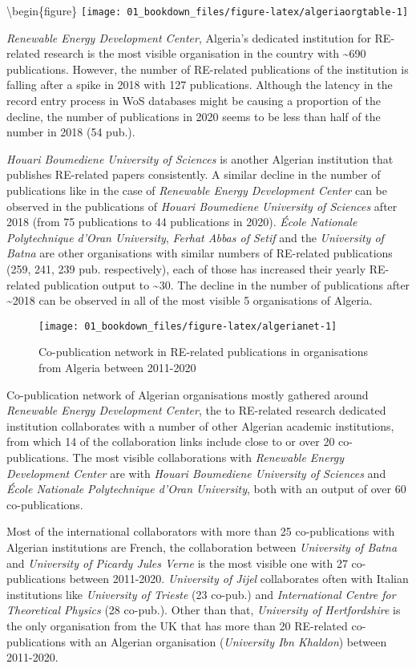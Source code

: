 \documentclass[12pt,twoside]{report}
\begin{document}
\textbackslash begin\{figure\}
\texttt{[image: 01\_bookdown\_files/figure-latex/algeriaorgtable-1]}

\emph{Renewable Energy Development Center}, Algeria's dedicated institution for RE-related research is the most visible organisation in the country with \textasciitilde690 publications. However, the number of RE-related publications of the institution is falling after a spike in 2018 with 127 publications. Although the latency in the record entry process in WoS databases might be causing a proportion of the decline, the number of publications in 2020 seems to be less than half of the number in 2018 (54 pub.).

\emph{Houari Boumediene University of Sciences} is another Algerian institution that publishes RE-related papers consistently. A similar decline in the number of publications like in the case of \emph{Renewable Energy Development Center} can be observed in the publications of \emph{Houari Boumediene University of Sciences} after 2018 (from 75 publications to 44 publications in 2020). \emph{École Nationale Polytechnique d'Oran University}, \emph{Ferhat Abbas of Setif} and the \emph{University of Batna} are other organisations with similar numbers of RE-related publications (259, 241, 239 pub. respectively), each of those has increased their yearly RE-related publication output to \textasciitilde30. The decline in the number of publications after \textasciitilde2018 can be observed in all of the most visible 5 organisations of Algeria.

\begin{figure}
\texttt{[image: 01\_bookdown\_files/figure-latex/algerianet-1]} \caption{Co-publication network in RE-related publications in organisations from Algeria between 2011-2020}\label{fig:algerianet}
\end{figure}

Co-publication network of Algerian organisations mostly gathered around \emph{Renewable Energy Development Center}, the to RE-related research dedicated institution collaborates with a number of other Algerian academic institutions, from which 14 of the collaboration links include close to or over 20 co-publications. The most visible collaborations with \emph{Renewable Energy Development Center} are with \emph{Houari Boumediene University of Sciences} and \emph{École Nationale Polytechnique d'Oran University}, both with an output of over 60 co-publications.

Most of the international collaborators with more than 25 co-publications with Algerian institutions are French, the collaboration between \emph{University of Batna} and \emph{University of Picardy Jules Verne} is the most visible one with 27 co-publications between 2011-2020. \emph{University of Jijel} collaborates often with Italian institutions like \emph{University of Trieste} (23 co-pub.) and \emph{International Centre for Theoretical Physics} (28 co-pub.). Other than that, \emph{University of Hertfordshire} is the only organisation from the UK that has more than 20 RE-related co-publications with an Algerian organisation (\emph{University Ibn Khaldon}) between 2011-2020.
\end{document}
